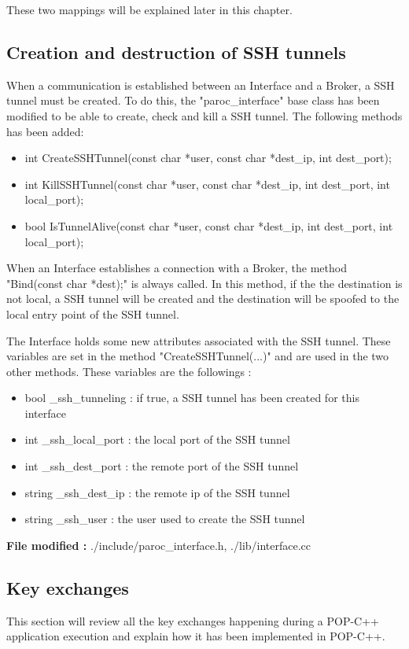 These two mappings will be explained later in this chapter.



\subsection{Creation and destruction of SSH tunnels}
When a communication is established between an Interface and a Broker, a SSH tunnel must be created. To do this, the "paroc\_interface" base class has been modified to be able to create, check and kill a SSH tunnel. The following methods has been added: 

\begin{itemize}
\item int CreateSSHTunnel(const char *user, const char *dest\_ip, int dest\_port);
\item int KillSSHTunnel(const char *user, const char *dest\_ip, int dest\_port, int local\_port);
\item bool IsTunnelAlive(const char *user, const char *dest\_ip, int dest\_port, int local\_port);
\end{itemize}\s

When an Interface establishes a connection with a Broker, the method "Bind(const char *dest);" is always called. In this method, if the the destination is not local, a SSH tunnel will be created and the destination will be spoofed to the local entry point of the SSH tunnel.\s

The Interface holds some new attributes associated with the SSH tunnel. These variables are set in the method "CreateSSHTunnel(...)" and are used in the two other methods. These variables are the followings : 
\begin{itemize}
\item bool \_ssh\_tunneling : if true, a SSH tunnel has been created for this interface
\item int \_ssh\_local\_port : the local port of the SSH tunnel
\item int \_ssh\_dest\_port : the remote port of the SSH tunnel
\item string \_ssh\_dest\_ip : the remote ip of the SSH tunnel
\item string \_ssh\_user : the user used to create the SSH tunnel
\end{itemize}\s

\textbf{File modified :} ./include/paroc\_interface.h, ./lib/interface.cc


\pagebreak
\subsection{Key exchanges}
This section will review all the key exchanges happening during a POP-C++ application execution and explain how it has been implemented in POP-C++.

